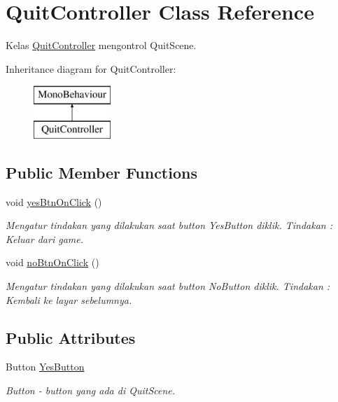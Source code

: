 \hypertarget{class_quit_controller}{}\section{Quit\+Controller Class Reference}
\label{class_quit_controller}


Kelas \hyperlink{class_quit_controller}{Quit\+Controller} mengontrol Quit\+Scene.  


Inheritance diagram for Quit\+Controller\+:\begin{figure}[H]
\begin{center}
\leavevmode
\includegraphics[height=2.000000cm]{class_quit_controller}
\end{center}
\end{figure}
\subsection*{Public Member Functions}
\begin{DoxyCompactItemize}
\item 
void \hyperlink{class_quit_controller_a3f4f0e9b67108e4a0608f4c2085cac84}{yes\+Btn\+On\+Click} ()
\begin{DoxyCompactList}\small\item\em Mengatur tindakan yang dilakukan saat button Yes\+Button diklik. Tindakan \+: Keluar dari game. \end{DoxyCompactList}\item 
void \hyperlink{class_quit_controller_aa0339f4778f5e947a0f1a041734757f0}{no\+Btn\+On\+Click} ()
\begin{DoxyCompactList}\small\item\em Mengatur tindakan yang dilakukan saat button No\+Button diklik. Tindakan \+: Kembali ke layar sebelumnya. \end{DoxyCompactList}\end{DoxyCompactItemize}
\subsection*{Public Attributes}
\begin{DoxyCompactItemize}
\item 
Button \hyperlink{class_quit_controller_a988a4085bd05debd186ee7475e758404}{Yes\+Button}
\begin{DoxyCompactList}\small\item\em Button -\/ button yang ada di Quit\+Scene. \end{DoxyCompactList}\end{DoxyCompactItemize}


